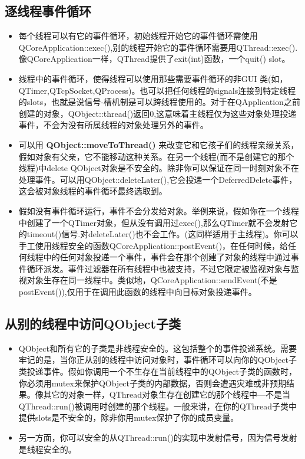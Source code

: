 \documentclass[9pt,b5paper]{article}
\begin{document}
\subsection{逐线程事件循环}
\label{sec-2-2}
\begin{itemize}
\item 每个线程可以有它的事件循环，初始线程开始它的事件循环需使用QCoreApplication::exec(),别的线程开始它的事件循环需要用QThread::exec().像QCoreApplication一样，QThread提供了exit(int)函数，一个quit() slot。
\item 线程中的事件循环，使得线程可以使用那些需要事件循环的非GUI 类(如，QTimer,QTcpSocket,QProcess)。也可以把任何线程的signals连接到特定线程的slots，也就是说信号-槽机制是可以跨线程使用的。对于在QApplication之前创建的对象，QObject::thread()返回0,这意味着主线程仅为这些对象处理投递事件，不会为没有所属线程的对象处理另外的事件。
\item 可以用 \textbf{QObject::moveToThread()} 来改变它和它孩子们的线程亲缘关系，假如对象有父亲，它不能移动这种关系。在另一个线程(而不是创建它的那个线程)中delete QObject对象是不安全的。除非你可以保证在同一时刻对象不在处理事件。可以用QObject::deleteLater(),它会投递一个DeferredDelete事件，这会被对象线程的事件循环最终选取到。
\item 假如没有事件循环运行，事件不会分发给对象。举例来说，假如你在一个线程中创建了一个QTimer对象，但从没有调用过exec(),那么QTimer就不会发射它的timeout()信号.对deleteLater()也不会工作。(这同样适用于主线程)。你可以手工使用线程安全的函数QCoreApplication::postEvent()，在任何时候，给任何线程中的任何对象投递一个事件，事件会在那个创建了对象的线程中通过事件循环派发。事件过滤器在所有线程中也被支持，不过它限定被监视对象与监视对象生存在同一线程中。类似地，QCoreApplication::sendEvent(不是postEvent()),仅用于在调用此函数的线程中向目标对象投递事件。
\end{itemize}
\subsection{从别的线程中访问QObject子类}
\label{sec-2-3}
\begin{itemize}
\item QObject和所有它的子类是非线程安全的。这包括整个的事件投递系统。需要牢记的是，当你正从别的线程中访问对象时，事件循环可以向你的QObject子类投递事件。假如你调用一个不生存在当前线程中的QObject子类的函数时，你必须用mutex来保护QObject子类的内部数据，否则会遭遇灾难或非预期结果。像其它的对象一样，QThread对象生存在创建它的那个线程中---不是当QThread::run()被调用时创建的那个线程。一般来讲，在你的QThread子类中提供slots是不安全的，除非你用mutex保护了你的成员变量。
\item 另一方面，你可以安全的从QThread::run()的实现中发射信号，因为信号发射是线程安全的。
\end{itemize}
\end{document}
